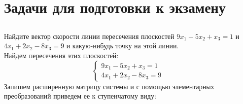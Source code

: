 \newpage		
	\section{Задачи для подготовки к экзамену}	
		\subsection{}
		Найдите вектор скорости линии пересечения плоскостей 
		$9x_{1} - 5x_{2} + x_{3} = 1$ и $4x_{1} + 2x_{2} - 8x_{3} = 9$
		и какую-нибудь точку на этой линии. 
		\\
		 Найдем пересечения этих плоскостей:
		\begin{equation*}
			\begin{cases}
				9x_{1} - 5x_{2} + x_{3} = 1\\
				4x_{1} + 2x_{2} - 8x_{3} = 9
			\end{cases}
		\end{equation*}
		Запишем расширенную матрицу системы и с помощью элементарных преобразований приведем ее к ступенчатому виду:\\
		
